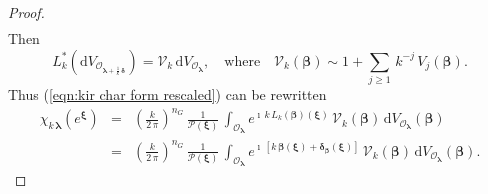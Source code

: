 \documentclass[12pt,a4paper]{article}
\theoremstyle{plain}
\theoremstyle{definition}
\begin{document}
\begin{proof}
\begin{eqnarray}
\nonumber
\end{eqnarray}
%
Then
\begin{equation}
\label{eqn:Vk beta exp}
L_k^*(\mathrm{d}
V_{\mathcal{O}_{\boldsymbol{\lambda}+\frac{1}{k}\,
\boldsymbol{\delta}}})=
\mathcal{V}_k\,
\mathrm{d}
V_{\mathcal{O}_{\boldsymbol{\lambda}}},\quad
\text{where}\quad
\mathcal{V}_k(\boldsymbol{\beta})\sim 1+
\sum_{j\ge 1}\,k^{-j}\,V_j(\boldsymbol{\beta}).
\end{equation}
Thus (\ref{eqn:kir char form rescaled}) can be rewritten
\begin{eqnarray}
\label{eqn:kir char form rescaled transl}
\chi_{k\,\boldsymbol{\lambda}}
\left(e^{\boldsymbol{\xi}}\right)
&=&\left(\frac{k}{2\,\pi}\right)^{n_G}\,
\frac{1}{\mathcal{P}(\boldsymbol{\xi})}\,
\int_{\mathcal{O}_{\boldsymbol{\lambda}}}
e^{\imath\,k\,L_k(\boldsymbol{\beta})(\boldsymbol{\xi})
}\,\mathcal{V}_k(\boldsymbol{\beta})\,
\mathrm{d}
V_{\mathcal{O}_{\boldsymbol{\lambda}}}
(\boldsymbol{\beta})\\
&=&\left(\frac{k}{2\,\pi}\right)^{n_G}\,
\frac{1}{\mathcal{P}(\boldsymbol{\xi})}\,
\int_{\mathcal{O}_{\boldsymbol{\lambda}}}
e^{\imath\,[k\,\boldsymbol{\beta}(\boldsymbol{\xi})+
\boldsymbol{\delta}_{\boldsymbol{\beta}}(\boldsymbol{\xi})]
}\,\mathcal{V}_k(\boldsymbol{\beta})\,
\mathrm{d}
V_{\mathcal{O}_{\boldsymbol{\lambda}}}
(\boldsymbol{\beta}).\nonumber
\end{eqnarray}


\end{proof}
\end{document}
